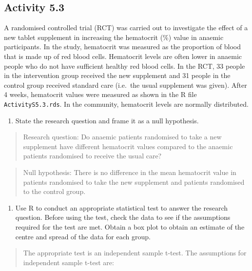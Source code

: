 \documentclass[
]{memoir}
\providecommand{\tightlist}{%
  \setlength{\itemsep}{0pt}\setlength{\parskip}{0pt}}
\begin{document}
\hypertarget{activity-5.3}{%
\subsection*{Activity 5.3}\label{activity-5.3}}

A randomised controlled trial (RCT) was carried out to investigate the effect of a new tablet supplement in increasing the hematocrit (\%) value in anaemic participants. In the study, hematocrit was measured as the proportion of blood that is made up of red blood cells. Hematocrit levels are often lower in anaemic people who do not have sufficient healthy red blood cells. In the RCT, 33 people in the intervention group received the new supplement and 31 people in the control group received standard care (i.e.~the usual supplement was given). After 4 weeks, hematocrit values were measured as shown in the R file \texttt{ActivityS5.3.rds}. In the community, hematocrit levels are normally distributed.

\begin{enumerate}
\def\labelenumi{\alph{enumi})}
\tightlist
\item
  State the research question and frame it as a null hypothesis.
\end{enumerate}

\begin{quote}
Research question: Do anaemic patients randomised to take a new supplement have different hematocrit values compared to the anaemic patients randomised to receive the usual care?
\end{quote}

\begin{quote}
Null hypothesis: There is no difference in the mean hematocrit value in patients randomised to take the new supplement and patients randomised to the control group.
\end{quote}

\begin{enumerate}
\def\labelenumi{\alph{enumi})}
\setcounter{enumi}{1}
\tightlist
\item
  Use R to conduct an appropriate statistical test to answer the research question. Before using the test, check the data to see if the assumptions required for the test are met. Obtain a box plot to obtain an estimate of the centre and spread of the data for each group.
\end{enumerate}

\begin{quote}
The appropriate test is an independent sample t-test. The assumptions for independent sample t-test are:
\end{quote}
\end{document}
